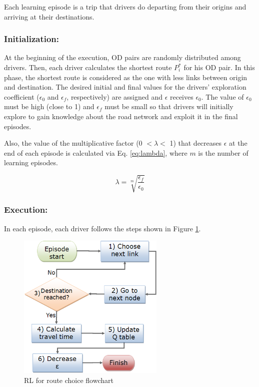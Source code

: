 \documentclass{RITA}
\begin{document}
Each learning episode is a trip that drivers do departing from their origins and arriving at their destinations.

\subsubsection{Initialization:}
At the beginning of the execution, OD pairs are randomly distributed among drivers. Then, each driver calculates the shortest route $P_i^*$ for his OD pair. In this phase, the shortest route is considered as the one with less links between origin and destination. The desired initial and final values for the drivers' exploration coefficient ($\epsilon_0$ and $\epsilon_f$, respectively) are assigned and $\epsilon$ receives $\epsilon_0$. The value of $\epsilon_0$ must be high (close to 1) and $\epsilon_f$ must be small so that drivers will initially explore to gain knowledge about the road network and exploit it in the final episodes.

Also, the value of the multiplicative factor (0 $< \lambda <$ 1) that decreases $\epsilon$ at the end of each episode is calculated via Eq. \eqref{eq:lambda}, where $m$ is the number of learning episodes.

\begin{equation}
\label{eq:lambda}
\lambda = \sqrt[m]{\frac{\epsilon_f}{\epsilon_0}}
\end{equation}

\subsubsection{Execution:}

In each episode, each driver follows the steps shown in Figure \ref{fig:flowchart}.

\begin{figure}[ht]
    \centerline{\includegraphics[width=7cm]{img/flowchart3.png}}
    \caption{RL for route choice flowchart}
    \label{fig:flowchart}
\end{figure}
\end{document}
